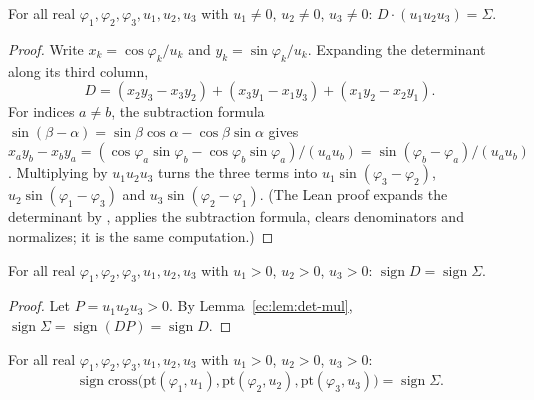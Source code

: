 \begin{lemma}\label{ec:lem:det-mul}
For all real $\varphi_1,\varphi_2,\varphi_3,u_1,u_2,u_3$ with $u_1\ne0$, $u_2\ne0$, $u_3\ne0$: $D\cdot(u_1u_2u_3)=\Sigma$.
\end{lemma}

\begin{proof}
Write $x_k=\cos\varphi_k/u_k$ and $y_k=\sin\varphi_k/u_k$. Expanding the determinant along its third column,
\begin{equation*}
D=(x_2y_3-x_3y_2)+(x_3y_1-x_1y_3)+(x_1y_2-x_2y_1).
\end{equation*}
For indices $a\ne b$, the subtraction formula $\sin(\beta-\alpha)=\sin\beta\cos\alpha-\cos\beta\sin\alpha$ gives
$x_ay_b-x_by_a=(\cos\varphi_a\sin\varphi_b-\cos\varphi_b\sin\varphi_a)/(u_au_b)=\sin(\varphi_b-\varphi_a)/(u_au_b)$.
Multiplying by $u_1u_2u_3$ turns the three terms into $u_1\sin(\varphi_3-\varphi_2)$, $u_2\sin(\varphi_1-\varphi_3)$
and $u_3\sin(\varphi_2-\varphi_1)$. (The Lean proof expands the determinant by , applies
the subtraction formula, clears denominators and normalizes; it is the same computation.)
\end{proof}

\begin{lemma}\label{ec:lem:polar-u}
For all real $\varphi_1,\varphi_2,\varphi_3,u_1,u_2,u_3$ with $u_1>0$, $u_2>0$, $u_3>0$:
$\operatorname{sign}D=\operatorname{sign}\Sigma$.
\end{lemma}

\begin{proof}
Let $P=u_1u_2u_3>0$. By Lemma~\ref{ec:lem:det-mul}, $\operatorname{sign}\Sigma=\operatorname{sign}(DP)=\operatorname{sign}D$.
\end{proof}

\begin{lemma}\label{ec:lem:polar-cross}
For all real $\varphi_1,\varphi_2,\varphi_3,u_1,u_2,u_3$ with $u_1>0$, $u_2>0$, $u_3>0$:
\begin{equation*}
\operatorname{sign}\mathrm{cross}\bigl(\mathrm{pt}(\varphi_1,u_1),\mathrm{pt}(\varphi_2,u_2),\mathrm{pt}(\varphi_3,u_3)\bigr)
=\operatorname{sign}\Sigma .
\end{equation*}
\end{lemma}

